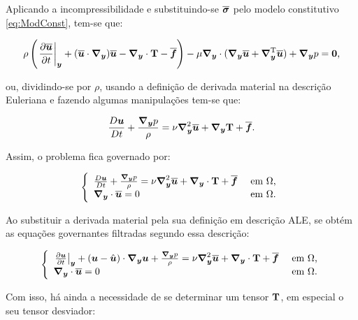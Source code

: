 Aplicando a incompressibilidade e substituindo-se $\bar{\tens}$ pelo modelo constitutivo \eqref{eq:ModConst}, tem-se que:

\begin{equation}
    \rho\bigpar{\dTime{\BBB{u}}+(\BBB{u}\cdot\Ny)\BBB{u}-\Ny\cdot\TS{T}-\BBB{f}}-\mu\Ny\cdot(\Ny\BBB{u}+\NyT\BBB{u})+\Ny p=\BB{0}\text{,}\label{eq:ConMasLES}
\end{equation}

\noindent ou, dividindo-se por $\rho$, usando a definição de derivada material na descrição Euleriana e fazendo algumas manipulações tem-se que:

\begin{equation}
    \frac{D\BB{u}}{Dt}+\frac{\Ny p}{\rho}=\nu\Lapl\BBB{u}+\Ny\TS{T}+\BBB{f}\text{.}
\end{equation}


Assim, o problema fica governado por:

\begin{equation}
    \left\{
    \begin{array}{ll}
        \frac{D\BB{u}}{Dt}+\frac{\Ny p}{\rho}=\nu\Lapl\BBB{u}+\Ny\cdot\TS{T}+\BBB{f} & \text{ em }\Omega\text{,} \\
        \Ny\cdot\BBB{u}=0                                                            & \text{ em }\Omega\text{.}
    \end{array}
    \right.
\end{equation}

Ao substituir a derivada material pela sua definição em descrição ALE, se obtém as equações governantes filtradas segundo essa descrição:

\begin{equation}
    \left\{
    \begin{array}{ll}
        \dTime{\BB{u}}+(\BB{u}-\uhat)\cdot\Ny\BB{u}+\frac{\Ny p}{\rho}=\nu\Lapl\BBB{u}+\Ny\cdot\TS{T}+\BBB{f} & \text{ em }\Omega\text{,} \\
        \Ny\cdot\BBB{u}=0                                                                                     & \text{ em }\Omega\text{.}
    \end{array}
    \right.
\end{equation}

Com isso, há ainda a necessidade de se determinar um tensor $\TS{T}$, em especial o seu tensor desviador:

